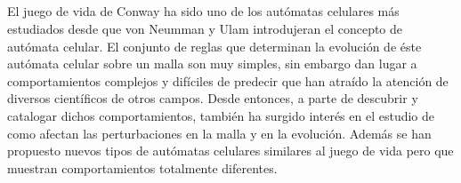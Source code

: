 \documentclass[../proyecto.tex]{memoir}
\begin{document}
\thispagestyle{empty}

\begin{center}
  {\large\bfseries \ProjectTitle}\\
\end{center}
  \begin{center}
  	
  \AuthorName\\
  \vspace{0.7cm}
  \\

  \vspace{0.7cm}
  \\

El juego de vida de Conway ha sido uno de los autómatas celulares más estudiados desde que von Neumman y Ulam introdujeran el concepto de autómata celular. El conjunto de reglas que determinan la evolución de éste autómata celular sobre un malla son muy simples, sin embargo dan lugar a comportamientos complejos y difíciles de predecir que han atraído la atención de diversos científicos de otros campos. Desde entonces, a parte de descubrir y catalogar dichos comportamientos, también ha surgido interés en el estudio de como afectan las perturbaciones en la malla y en la evolución. Además se han propuesto nuevos tipos de autómatas celulares similares al juego de vida pero que muestran comportamientos totalmente diferentes.


\end{center}

\newpage
\end{document}
